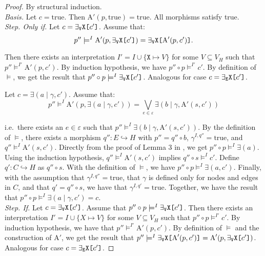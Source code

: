 \documentclass{llncs}
\newcommand{\mt}[1]{\text{\tt{#1}}}
\begin{document}
	\begin{proof}
		By structural induction.\\

		\noindent \emph{Basis.} Let $c= \text{true}$. Then $\text{A}'(p,\text{true}) = \text{true}$. All morphisms satisfy true.\\

		\noindent \emph{Step. Only if.} Let $c = \exists_\mathtt{V}\mathtt{X}\mt{[}c'\mt{]}$. Assume that:
		\[p'' \models^I \text{A}'(p,\exists_\mathtt{V}\mathtt{X}\mt{[}c'\mt{]}) = \exists_\mathtt{V}\mathtt{X}\mt{[}\text{A}'(p,c')\mt{]}.\]
		
		\noindent Then there exists an interpretation $I' = I \cup \{\mathtt{X}\mapsto V\}$ for some $V \subseteq V_H$ such that $p'' \models^{I'} \text{A}'(p,c')$. By induction hypothesis, we have $p'' \circ p \models^{I'} c'$. By definition of $\models$, we get the result that $p'' \circ p \models^I \exists_\mathtt{V}\mathtt{X}\mt{[}c'\mt{]}$. Analogous for case $c = \exists_\mathtt{E}\mathtt{X}\mt{[}c'\mt{]}$.

		Let $c = \exists(a \mid \gamma,c')$. Assume that:
		\[p'' \models^{I} \text{A}'(p,\exists(a \mid \gamma,c')) = \bigvee_{e\in\varepsilon}\exists(b\mid\gamma,\text{A}'(s,c'))\]
		
		\noindent i.e.\ there exists an $e\in\varepsilon$ such that $p'' \models^I \exists(b\mid\gamma,\text{A}'(s,c'))$. By the definition of $\models$, there exists a morphism $q''\!: E \hookrightarrow H$ with $p'' = q'' \circ b$, $\gamma^{I,q''} = \text{true}$, and $q''\models^I \text{A}'(s,c')$. Directly from the proof of Lemma 3 in \cite{Habel-Pennemann09a}, we get $p''\circ p \models^{I} \exists (a)$. Using the induction hypothesis, $q''\models^I \text{A}'(s,c')$ implies $q'' \circ s \models^{I} c'$. Define $q'\!: C\hookrightarrow H$ as $q'' \circ s$. With the definition of $\models$, we have $p''\circ p \models^{I} \exists(a,c')$. Finally, with the assumption that $\gamma^{I,q''} = \text{true}$, that $\gamma$ is defined only for nodes and edges in $C$, and that $q' = q'' \circ s$, we have that $\gamma^{I,q'} = \text{true}$. Together, we have the result that $p'' \circ p \models^{I} \exists(a\mid \gamma,c') = c$.\\

		\noindent \emph{Step. If.} Let $c = \exists_\mathtt{V}\mathtt{X}\mt{[}c'\mt{]}$. Assume that $p''\circ p \models^I \exists_\mathtt{V}\mathtt{X}\mt{[}c'\mt{]}$. Then there exists an interpretation $I' = I \cup \{X\mapsto V\}$ for some $V\subseteq V_H$ such that $p''\circ p \models^{I'} c'$. By induction hypothesis, we have that $p'' \models^{I'} \text{A}'(p,c')$. By definition of $\models$ and the construction of $\text{A}'$, we get the result that $p'' \models^I \exists_\mathtt{V}\mathtt{X}\mt{[}\text{A}'(p,c')\mt{]} = \text{A}'(p,\exists_\mathtt{V}\mathtt{X}\mt{[}c'\mt{]})$. Analogous for case $c = \exists_\mathtt{E}\mathtt{X}\mt{[}c'\mt{]}$.


\end{proof}
\end{document}
